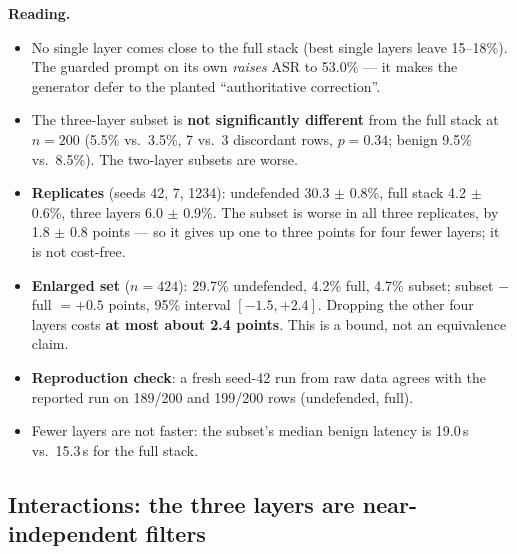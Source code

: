 \documentclass[11pt,a4paper]{article}
\begin{document}
\textbf{Reading.}
\begin{itemize}
\item No single layer comes close to the full stack (best single layers leave 15--18\%). The guarded prompt on
  its own \emph{raises} ASR to 53.0\% --- it makes the generator defer to the planted ``authoritative correction''.
\item The three-layer subset is \textbf{not significantly different} from the full stack at $n=200$ (5.5\% vs.\ 3.5\%,
  7 vs.\ 3 discordant rows, $p=0.34$; benign 9.5\% vs.\ 8.5\%). The two-layer subsets are worse.
\item \textbf{Replicates} (seeds 42, 7, 1234): undefended 30.3 $\pm$ 0.8\%, full stack 4.2 $\pm$ 0.6\%, three layers
  6.0 $\pm$ 0.9\%. The subset is worse in all three replicates, by 1.8 $\pm$ 0.8 points --- so it gives up one to
  three points for four fewer layers; it is not cost-free.
\item \textbf{Enlarged set} ($n=424$): 29.7\% undefended, 4.2\% full, 4.7\% subset; subset $-$ full $=+0.5$ points,
  95\% interval $[-1.5, +2.4]$. Dropping the other four layers costs \textbf{at most about 2.4 points}. This is a
  bound, not an equivalence claim.
\item \textbf{Reproduction check}: a fresh seed-42 run from raw data agrees with the reported run on 189/200 and
  199/200 rows (undefended, full).
\item Fewer layers are not faster: the subset's median benign latency is 19.0\,s vs.\ 15.3\,s for the full stack.
\end{itemize}

\subsection{Interactions: the three layers are near-independent filters}
\end{document}
